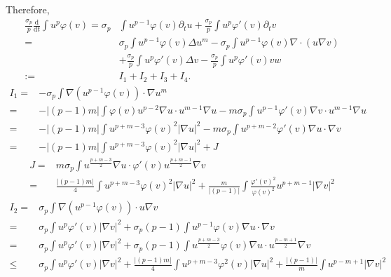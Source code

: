 \documentclass[12pt,]{article}
\begin{document}
Therefore, 
\begin{equation}
\begin{aligned}
\frac{\sigma_{p}}{p}\frac{\mathrm{d}}{\mathrm{d} t} \int u^{p} \varphi(v)=\sigma_{p}&\int u^{p-1}\varphi(v)\partial_t u  + \frac{\sigma_{p}}{p}\int u^p\varphi'(v)\partial_tv\\
  =&\sigma_{p}\int u^{p-1}\varphi(v)\Delta u^m- \sigma_{p}\int u^{p-1}\varphi(v)\nabla\cdot(u\nabla v)\\
  &+ \frac{\sigma_{p}}{p}\int u^p\varphi'(v)\Delta v -\frac{\sigma_{p}}{p} \int u^p\varphi'(v)vw\\
  :=& I_1 + I_2 + I_3 + I_4.
\end{aligned}
\end{equation}
\begin{equation}
  \begin{aligned}
    I_1=&-\sigma_{p}\int \nabla(u^{p-1}\varphi(v))\cdot\nabla u^m\\
    =&-|(p-1)m|\int \varphi(v)u^{p-2}\nabla u \cdot u^{m-1}\nabla u - m\sigma_{p}\int u^{p-1}\varphi'(v)\nabla v \cdot u ^{m-1}\nabla u \\
    =&-|(p-1)m|\int u^{p+m-3}\varphi(v)^2|\nabla u| ^2 - m\sigma_{p} \int u^{p+m-2}\varphi'(v)\nabla u \cdot \nabla v\\
    =&-|(p-1)m|\int u^{p+m-3}\varphi(v)^2|\nabla u| ^2 + J
  \end{aligned}
\end{equation}
\begin{equation}
  \begin{aligned}
    J =& m\sigma_{p}\int u^{\frac{p+m-3}{2}}\nabla u\cdot\varphi'(v)u^{\frac{p+m-1}{2}}\nabla v\\
    =&\frac{|(p-1)m|}{4} \int u^{p+m-3}\varphi(v)^2|\nabla u|^2 + \frac{m}{|(p-1)|}\int \frac{\varphi'(v)^2}{\varphi(v)^2}u^{p+m-1}|\nabla v|^2
  \end{aligned}
\end{equation}
\begin{equation}
  \begin{aligned}
    I_2 =& \sigma_{p}\int \nabla(u^{p-1}\varphi(v))\cdot u\nabla v\\
    =& \sigma_{p}\int u^p\varphi'(v)|\nabla v|^2 + \sigma_{p}(p-1)\int u^{p-1}\varphi(v)\nabla u\cdot \nabla v\\
    = & \sigma_{p}\int u^p\varphi'(v)|\nabla v|^2 + \sigma_{p}(p-1)\int u^{\frac{p+m-3}{2}}\varphi(v)\nabla u \cdot u^{\frac{p-m+1}{2}} \nabla v\\
    \leqslant & \sigma_{p}\int u^p\varphi'(v)|\nabla v|^2 + \frac{|(p-1)m|}{4} \int u^{p+m-3}\varphi^2(v)|\nabla u|^{2} + \frac{|(p-1)|}{m}\int u^{p-m+1}|\nabla v|^2
  \end{aligned}
\end{equation}
\end{document}
